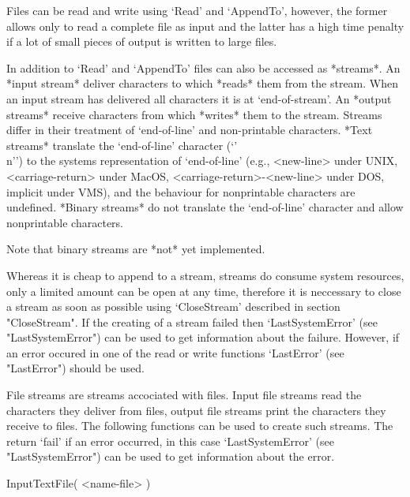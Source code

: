 
Files can be  read and  write using  `Read' and  `AppendTo', however, the
former allows only to read a complete file as {\GAP} input and the latter
has a high time penalty if a lot of small pieces  of output is written to
large files.

In  addition  to `Read' and  `AppendTo'  files  can  also be accessed  as
*streams*.  An *input stream*  deliver characters to {\GAP} which *reads*
them from the stream.  When an  input stream has delivered all characters
it is at `end-of-stream'.   An  *output streams* receive characters  from
{\GAP}  which *writes*  them to   the stream.   Streams  differ in  their
treatment of  `end-of-line' and non-printable characters.  *Text streams*
translate the   `end-of-line'  character   (`{'\\n'}')  to   the  systems
representation  of      `end-of-line' (e.g., <new-line>     under   UNIX,
<carriage-return>   under MacOS, <carriage-return>-<new-line> under  DOS,
implicit under  VMS), and the  behaviour for nonprintable  characters are
undefined.  *Binary streams* do not translate the `end-of-line' character
and allow nonprintable characters.

Note that binary streams are *not* yet implemented.

Whereas it  is cheap to  append to  a  stream, streams do  consume system
resources, only a limited amount can be open at any time, therefore it is
neccessary to  close  a stream as soon  as  possible using  `CloseStream'
described  in section "CloseStream".  If the  creating of a stream failed
then   `LastSystemError' (see  "LastSystemError")  can   be used to   get
information about the failure. However, if an error occured in one of the
read or write functions `LastError' (see "LastError") should be used.


File streams are streams accociated with  files.  Input file streams read
the characters  they deliver from   files, output file streams print  the
characters they receive to files.  The following functions can be used to
create such  streams.  The return  `fail'  if an error occurred,  in this
case  `LastSystemError'  (see  "LastSystemError")   can be   used  to get
information about the error.

\>InputTextFile( <name-file> )

